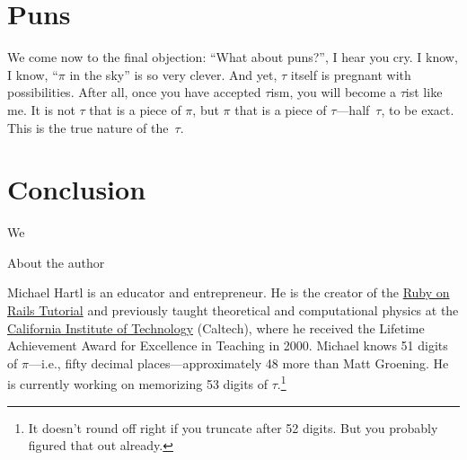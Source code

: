 \documentclass{article}
\begin{document}

\section{Puns}

We come now to the final objection: ``What about puns?'', I hear you cry. I know, I know, ``$\pi$ in the sky'' is so very clever. And yet, $\tau$ itself is pregnant with possibilities. After all, once you have accepted $\tau$ism, you will become a $\tau$ist like me. It is not $\tau$ that is a piece of $\pi$, but $\pi$ that is a piece of $\tau$---half~$\tau$, to be exact. This is the true nature of the~$\tau$.

\section{Conclusion}

We

About the author

Michael Hartl is an educator and entrepreneur. He is the creator of the  \href{http://www.railstutorial.org/}{Ruby on Rails Tutorial} and previously taught theoretical and computational physics at the \href{http://www.caltech.edu/}{California Institute of Technology} (Caltech), where he received the Lifetime Achievement Award for Excellence in Teaching in 2000. Michael knows 51 digits of $\pi$---i.e., fifty decimal places---approximately 48 more than Matt Groening. He is currently working on memorizing 53 digits of $\tau$.\footnote{It doesn't round off right if you truncate after 52 digits. But you probably figured that out already.}
\end{document}
